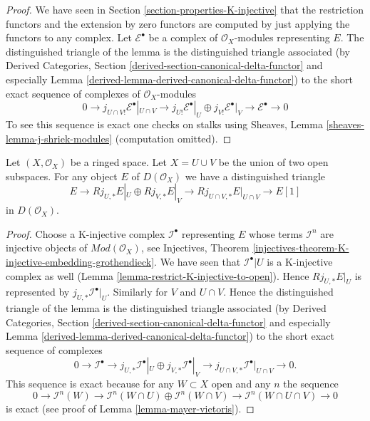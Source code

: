 \begin{proof}
We have seen in Section \ref{section-properties-K-injective}
that the restriction functors and the extension
by zero functors are computed by just applying the functors to
any complex. Let $\mathcal{E}^\bullet$ be a complex of $\mathcal{O}_X$-modules
representing $E$. The distinguished triangle of the lemma is the
distinguished triangle associated (by
Derived Categories, Section
\ref{derived-section-canonical-delta-functor} and especially
Lemma \ref{derived-lemma-derived-canonical-delta-functor})
to the short exact sequence of complexes of $\mathcal{O}_X$-modules
$$
0 \to j_{U \cap V!}\mathcal{E}^\bullet|_{U \cap V} \to
j_{U!}\mathcal{E}^\bullet|_U \oplus j_{V!}\mathcal{E}^\bullet|_V
\to \mathcal{E}^\bullet \to 0
$$
To see this sequence is exact one checks on stalks using
Sheaves, Lemma \ref{sheaves-lemma-j-shriek-modules}
(computation omitted).
\end{proof}

\begin{lemma}
\label{lemma-exact-sequence-j-star}
Let $(X, \mathcal{O}_X)$ be a ringed space.
Let $X = U \cup V$ be the union of two open subspaces.
For any object $E$ of $D(\mathcal{O}_X)$ we have a distinguished
triangle
$$
E \to 
Rj_{U, *}E|_U \oplus Rj_{V, *}E|_V \to
Rj_{U \cap V, *}E|_{U \cap V} \to
E[1]
$$
in $D(\mathcal{O}_X)$.
\end{lemma}

\begin{proof}
Choose a K-injective complex $\mathcal{I}^\bullet$ representing $E$
whose terms $\mathcal{I}^n$ are injective objects of
$\textit{Mod}(\mathcal{O}_X)$, see Injectives, Theorem
\ref{injectives-theorem-K-injective-embedding-grothendieck}.
We have seen that $\mathcal{I}^\bullet|U$ is a K-injective complex
as well (Lemma \ref{lemma-restrict-K-injective-to-open}). Hence
$Rj_{U, *}E|_U$ is represented by $j_{U, *}\mathcal{I}^\bullet|_U$.
Similarly for $V$ and $U \cap V$. Hence the distinguished triangle
of the lemma is the distinguished triangle associated (by
Derived Categories, Section
\ref{derived-section-canonical-delta-functor} and especially
Lemma \ref{derived-lemma-derived-canonical-delta-functor})
to the short exact sequence of complexes
$$
0 \to
\mathcal{I}^\bullet \to
j_{U, *}\mathcal{I}^\bullet|_U \oplus j_{V, *}\mathcal{I}^\bullet|_V \to
j_{U \cap V, *}\mathcal{I}^\bullet|_{U \cap V} \to
0.
$$
This sequence is exact because for any $W \subset X$ open
and any $n$ the sequence
$$
0 \to
\mathcal{I}^n(W) \to
\mathcal{I}^n(W \cap U) \oplus \mathcal{I}^n(W \cap V) \to
\mathcal{I}^n(W \cap U \cap V) \to
0
$$
is exact (see proof of Lemma \ref{lemma-mayer-vietoris}).
\end{proof}


